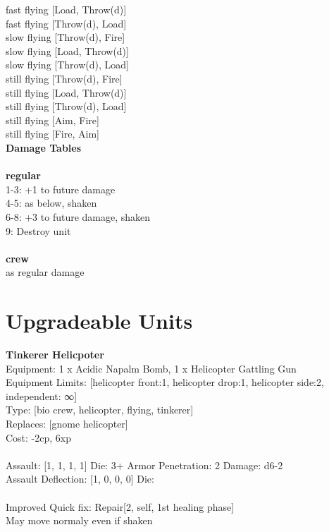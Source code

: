 fast flying [Load, Throw(d)] \\
fast flying [Throw(d), Load] \\
slow flying [Throw(d), Fire] \\
slow flying [Load, Throw(d)] \\
slow flying [Throw(d), Load] \\
still flying [Throw(d), Fire] \\
still flying [Load, Throw(d)] \\
still flying [Throw(d), Load] \\
still flying [Aim, Fire] \\
still flying [Fire, Aim] \\


{\bf Damage Tables} \\
\ \\ {\bf regular } \\
1-3: +1 to future damage \\
4-5: as below, shaken \\
6-8: +3 to future damage, shaken \\
9: Destroy unit \\
\ \\ {\bf crew } \\
as regular damage \\










\pagebreak\section{Upgradeable Units}{\bf Tinkerer Helicpoter } \\
Equipment: 1 x Acidic Napalm Bomb, 1 x Helicopter Gattling Gun \\
Equipment Limits: [helicopter front:1, helicopter drop:1, helicopter side:2, independent: ∞] \\
Type: [bio crew, helicopter, flying, tinkerer] \\
Replaces: [gnome helicopter] \\
Cost: -2cp, 6xp\\
\ \\
Assault: [1, 1, 1, 1] Die: 3+ Armor Penetration: 2 Damage: d6-2 \\
Assault Deflection: [1, 0, 0, 0] Die: \\
\indent  
\ \\
Improved Quick fix: Repair[2, self, 1st healing phase]\\ 
May move normaly even if shaken\\ 

